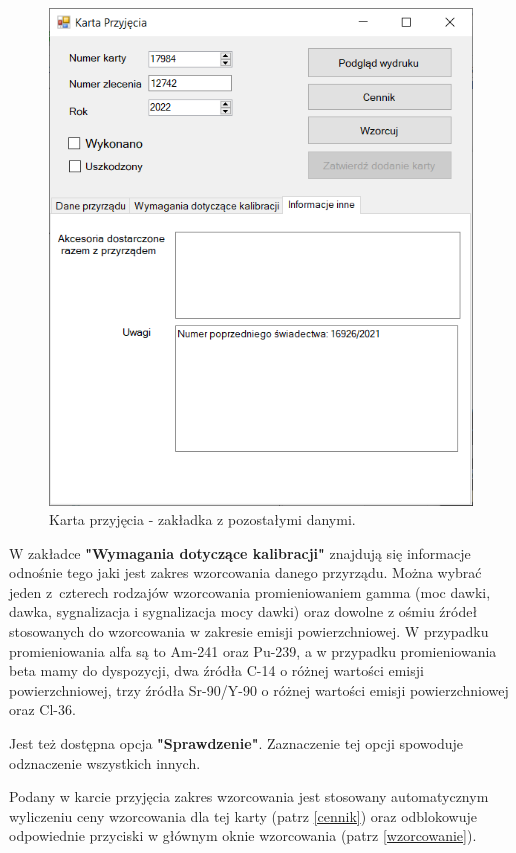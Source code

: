  \begin{figure}[htb]
 	\centering
 	\includegraphics{obrazki/Biuro/karta/karta_dane_inne.png}
 	\caption{Karta przyjęcia - zakładka z pozostałymi danymi.}
 	\label{kartaDaneInne}
 \end{figure}

W zakładce \textbf{"Wymagania dotyczące kalibracji"} znajdują się informacje odnośnie tego jaki jest zakres wzorcowania danego przyrządu. Można wybrać jeden z~czterech rodzajów wzorcowania promieniowaniem gamma (moc dawki, dawka, sygnalizacja i sygnalizacja mocy dawki) oraz dowolne z ośmiu źródeł stosowanych do wzorcowania w zakresie emisji powierzchniowej. W przypadku promieniowania alfa są to Am-241 oraz Pu-239, a w przypadku promieniowania beta mamy do dyspozycji, dwa źródła C-14 o różnej wartości emisji powierzchniowej, trzy źródła Sr-90/Y-90 o różnej wartości emisji powierzchniowej oraz Cl-36. 

Jest też dostępna opcja \textbf{"Sprawdzenie"}. Zaznaczenie tej opcji spowoduje odznaczenie wszystkich innych.

Podany w karcie przyjęcia zakres wzorcowania jest stosowany automatycznym wyliczeniu ceny wzorcowania dla tej karty (patrz \ref{cennik}) oraz odblokowuje odpowiednie przyciski w głównym oknie wzorcowania (patrz \ref{wzorcowanie}).

